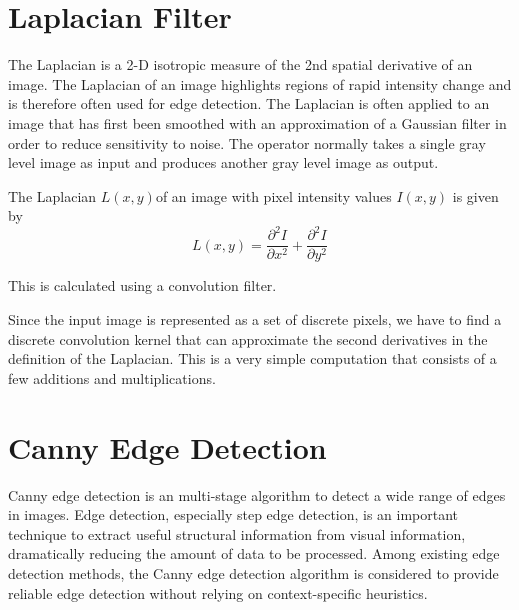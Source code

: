 	
	\section{Laplacian Filter}
	The Laplacian is a 2-D isotropic measure of the 2nd spatial derivative
	of an image. The Laplacian of an image highlights regions of rapid
	intensity change and is therefore often used for edge detection. The
	Laplacian is often applied to an image that has first been smoothed
	with an approximation of a Gaussian filter in order to reduce
	sensitivity to noise. The operator normally takes a single gray level
	image as input and produces another gray level image as output.
	
	The Laplacian \begin{math} L(x,y)\end{math}of an image with pixel
	intensity values \begin{math}I(x,y)\end{math} is given by
	\begin{equation}
	L(x,y) = \frac{\partial^2 I}{\partial x^2} + \frac{\partial^2 I}{\partial y^2}
	\end{equation} 
	
	This is calculated using a convolution filter.
	
	Since the input image is represented as a set of discrete pixels, we
	have to find a discrete convolution kernel that can approximate the
	second derivatives in the definition of the Laplacian. This is a very
	simple computation that consists of a few additions and
	multiplications.
	
	\section{Canny Edge Detection}
	Canny edge detection\cite{Canny86} is an multi-stage algorithm to
	detect a wide range of edges in images. Edge detection, especially
	step edge detection, is an important technique to extract useful
	structural information from visual information, dramatically reducing
	the amount of data to be processed. Among existing edge detection
	methods, the Canny edge detection algorithm is considered to provide
	reliable edge detection without relying on context-specific
	heuristics.
	
